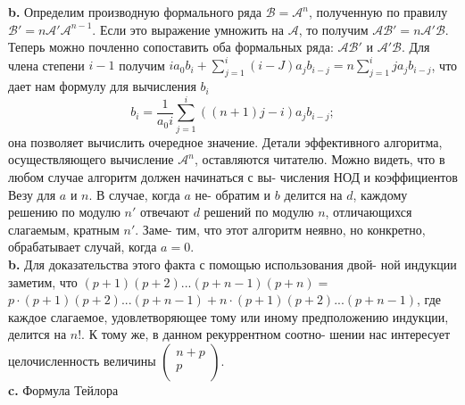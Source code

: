 \textbf{b.} Определим производную формального ряда $\mathcal{B} = \mathcal{A}^n$, полученную по правилу $\mathcal{B}' = n\mathcal{A}'\mathcal{A}^{n-1}$.
Если это выражение умножить на $\mathcal{A}$, то получим $\mathcal{AB}' = n\mathcal{A}'\mathcal{B}$. Теперь можно почленно сопоставить
оба формальных ряда: $\mathcal{AB}'$ и $\mathcal{A}'\mathcal{B}$. Для члена степени $i - 1$ получим
$ia_0 b_i + \sum^i_{j=1} (i-J)a_j b_{i-j} = n\sum^i_{j=1} ja_j b_{i-j}$, что дает нам формулу для вычисления $b_i$
\begin{equation*}
b_i = \frac{1}{a_0 i} \sum\limits^i_{j=1}((n + 1)j - i)a_j b_{i-j};
\end{equation*}
она позволяет вычислить очередное значение. Детали эффективного алгоритма,
осуществляющего вычисление $\mathcal{A}^n$, оставляются читателю.
\newpage
\noindent Можно видеть, что в любом случае алгоритм должен начинаться с вы-\linebreak
числения НОД и коэффициентов Везу для $a$ и $n$. В случае, когда $a$ не­-\linebreak
обратим и $b$ делится на $d$, каждому решению по модулю $n'$ отвечают\linebreak
$d$ решений по модулю $n$, отличающихся слагаемым, кратным $n'$. Заме­-\linebreak
тим, что этот алгоритм неявно, но конкретно, обрабатывает случай,\linebreak
когда $a=0$.\newline
\\
\hspace*{15pt}\textbf{b.} Для доказательства этого факта с помощью использования двой­-\linebreak
ной индукции заметим, что $(p+1)(p+2)...(p+n-1)(p+n)=$\linebreak
$p\cdot(p+1)(p+2)...(p+n-1)+n\cdot(p+1)(p+2)...(p+n-1)$, где\linebreak
каждое слагаемое, удовлетворяющее тому или иному предположению\linebreak
индукции, делится на $n!$. К тому же, в данном рекуррентном соотно-\linebreak
шении нас интересует целочисленность величины $\left(\begin{smallmatrix}
n+p\\ p\\
\end{smallmatrix}\right).$\newline
\\
\hspace*{15pt}\textbf{c.} Формула Тейлора
